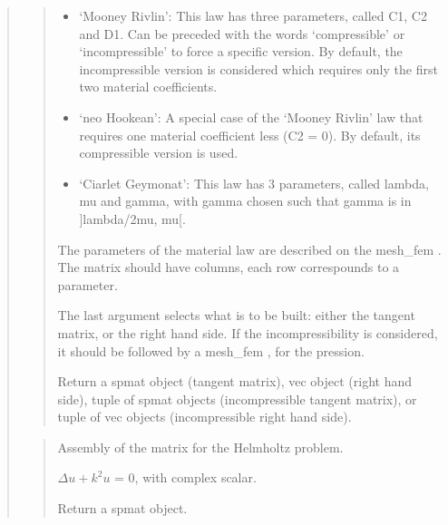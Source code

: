\documentclass[a4paper,11pt,english]{sphinxmanual}
\begin{document}
\begin{quote}
\begin{quote}
\begin{itemize}
\item {} 
‘Mooney Rivlin’:
This law has three parameters, called C1, C2 and D1.
Can be preceded with the words ‘compressible’ or ‘incompressible’ to force
a specific version. By default, the incompressible version is considered
which requires only the first two material coefficients.

\item {} 
‘neo Hookean’:
A special case of the ‘Mooney Rivlin’ law that requires one material
coefficient less (C2 = 0). By default, its compressible version is used.

\item {} 
‘Ciarlet Geymonat’:
This law has 3 parameters, called lambda, mu and gamma, with
gamma chosen such that gamma is in {]}\sphinxhyphen{}lambda/2\sphinxhyphen{}mu, \sphinxhyphen{}mu{[}.

\end{itemize}

The parameters of the material law are described on the mesh\_fem .
The matrix  should have  columns, each row
correspounds to a parameter.

The last argument selects what is to be built: either the tangent
matrix, or the right hand side. If the incompressibility is
considered, it should be followed by a mesh\_fem , for the
pression.

Return a spmat object (tangent matrix), vec object (right hand
side), tuple of spmat objects (incompressible tangent matrix), or
tuple of vec objects (incompressible right hand side).
\end{quote}

\begin{quote}

Assembly of the matrix for the Helmholtz problem.

\(\Delta u + k^2 u\) = 0,  with  complex scalar.

Return a spmat object.
\end{quote}

\begin{quote}


\end{quote}
\end{quote}
\end{document}
